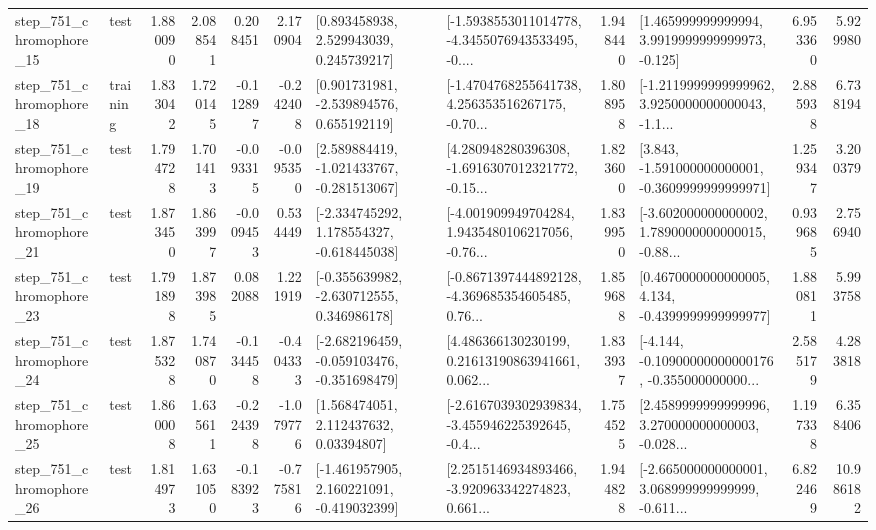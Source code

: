 \begin{tabular}{llrrrrllrlrr}
  step\_751\_chromophore\_15 &      test &      1.880090 &    2.088541 &      0.208451 &  2.170904 &     [0.893458938, 2.529943039, 0.245739217] &  [-1.5938553011014778, -4.3455076943533495, -0.... &       1.948440 &    [1.465999999999994, 3.9919999999999973, -0.125] &            6.953360 &          5.929980 \\
  step\_751\_chromophore\_18 &  training &      1.833042 &    1.720145 &     -0.112897 & -0.242408 &    [0.901731981, -2.539894576, 0.655192119] &  [-1.4704768255641738, 4.256353516267175, -0.70... &       1.808958 &  [-1.2119999999999962, 3.9250000000000043, -1.1... &            2.885938 &          6.738194 \\
  step\_751\_chromophore\_19 &      test &      1.794728 &    1.701413 &     -0.093315 & -0.095350 &   [2.589884419, -1.021433767, -0.281513067] &  [4.280948280396308, -1.6916307012321772, -0.15... &       1.823600 &   [3.843, -1.591000000000001, -0.3609999999999971] &            1.259347 &          3.200379 \\
  step\_751\_chromophore\_21 &      test &      1.873450 &    1.863997 &     -0.009453 &  0.534449 &   [-2.334745292, 1.178554327, -0.618445038] &  [-4.001909949704284, 1.9435480106217056, -0.76... &       1.839950 &  [-3.602000000000002, 1.7890000000000015, -0.88... &            0.939685 &          2.756940 \\
  step\_751\_chromophore\_23 &      test &      1.791898 &    1.873985 &      0.082088 &  1.221919 &   [-0.355639982, -2.630712555, 0.346986178] &  [-0.8671397444892128, -4.369685354605485, 0.76... &       1.859688 &   [0.4670000000000005, 4.134, -0.4399999999999977] &            1.880811 &          5.993758 \\
  step\_751\_chromophore\_24 &      test &      1.875328 &    1.740870 &     -0.134458 & -0.404333 &  [-2.682196459, -0.059103476, -0.351698479] &  [4.486366130230199, 0.21613190863941661, 0.062... &       1.833937 &  [-4.144, -0.10900000000000176, -0.355000000000... &            2.585179 &          4.283818 \\
  step\_751\_chromophore\_25 &      test &      1.860008 &    1.635611 &     -0.224398 & -1.079776 &      [1.568474051, 2.112437632, 0.03394807] &  [-2.6167039302939834, -3.455946225392645, -0.4... &       1.754525 &  [2.4589999999999996, 3.270000000000003, -0.028... &            1.197338 &          6.358406 \\
  step\_751\_chromophore\_26 &      test &      1.814973 &    1.631050 &     -0.183923 & -0.775816 &   [-1.461957905, 2.160221091, -0.419032399] &  [2.2515146934893466, -3.920963342274823, 0.661... &       1.944828 &  [-2.665000000000001, 3.068999999999999, -0.611... &            6.822469 &         10.986182 \\

\end{tabular}
